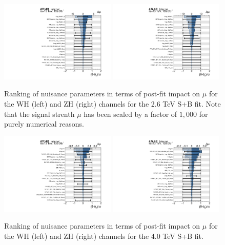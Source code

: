 \begin{figure}[htbp!]
    \begin{center}
        \includegraphics[width=0.49\textwidth]{Ranking_WH_2600.pdf}
        \includegraphics[width=0.49\textwidth]{Ranking_ZH_2600.pdf}
    \end{center}
    \caption{Ranking of nuisance parameters in terms of post-fit impact on $\hat{\mu}$ for the WH (left) and ZH (right) channels for the 2.6 TeV S+B fit.
        Note that the signal strenth $\mu$ has been scaled by a factor of $1,000$ for purely numerical reasons.
    }
    \label{fig:rank_plots_2p6TeV}
\end{figure}

\begin{figure}[htbp!]
    \begin{center}
        \includegraphics[width=0.49\textwidth]{Ranking_WH_4000.pdf}
        \includegraphics[width=0.49\textwidth]{Ranking_ZH_4000.pdf}
    \end{center}
    \caption{Ranking of nuisance parameters in terms of post-fit impact on $\hat{\mu}$ for the WH (left) and ZH (right) channels for the 4.0 TeV S+B fit.}
    \label{fig:rank_plots_4TeV}
\end{figure}

